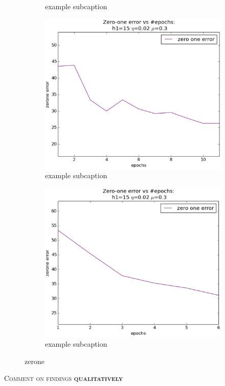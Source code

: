 \begin{figure}[!ht]
\begin{subfigure}[b]{.45\textwidth}
	\caption{example subcaption}
	\label{fig:3_5_tuned}
	\end{subfigure}
	\quad
	\begin{subfigure}[b]{.45\textwidth}
	\centering
	\includegraphics[width=\textwidth]{mlp/plots/zerone_optimize_4_9.eps}
	\caption{example subcaption}
	\label{fig:4_9_tuned_zerone}
	\end{subfigure}
	\quad
	\begin{subfigure}[b]{.45\textwidth}
	\centering
	\includegraphics[width=\textwidth]{mlp/plots/zerone_optimize_3_5.eps}
	\caption{example subcaption}
	\label{fig:3_5_tuned_zerone}
	\end{subfigure}

	\caption{zerone}
	\label{fig:binary_subtasks}
\end{figure}
\textsc{Comment on findings \textbf{qualitatively}}		


